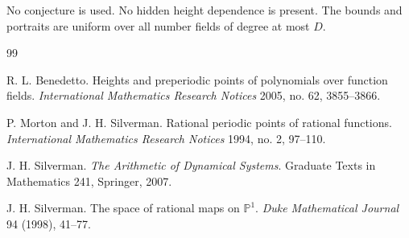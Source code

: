 \documentclass[11pt]{article}
\begin{document}
No conjecture is used. No hidden height dependence is present. The bounds and portraits are uniform over all number fields of degree at most \(D\).

\begin{thebibliography}{99}

R. L. Benedetto.
Heights and preperiodic points of polynomials over function fields.
\emph{International Mathematics Research Notices} 2005, no. 62, 3855--3866.

P. Morton and J. H. Silverman.
Rational periodic points of rational functions.
\emph{International Mathematics Research Notices} 1994, no. 2, 97--110.

J. H. Silverman.
\emph{The Arithmetic of Dynamical Systems}.
Graduate Texts in Mathematics 241, Springer, 2007.

J. H. Silverman.
The space of rational maps on \(\mathbb P^1\).
\emph{Duke Mathematical Journal} 94 (1998), 41--77.

\end{thebibliography}
\end{document}
